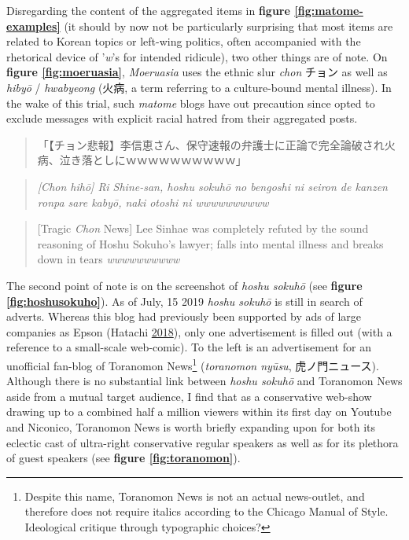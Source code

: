 \documentclass[10pt,british,A4paper,,openany]{memoir}
\begin{document}
Disregarding the content of the aggregated items in \textbf{figure
\ref{fig:matome-examples}} (it should by now not be particularly
surprising that most items are related to Korean topics or left-wing
politics, often accompanied with the rhetorical device of '\emph{w}'s
for intended ridicule), two other things are of note. On \textbf{figure
\ref{fig:moeruasia}}, \emph{Moeruasia} uses the ethnic slur \emph{chon}
チョン as well as \emph{hibyō} / \emph{hwabyeong} (火病, a term
referring to a culture-bound mental illness). In the wake of this trial,
such \emph{matome} blogs have out precaution since opted to exclude
messages with explicit racial hatred from their aggregated posts.

\begin{quote}
「【チョン悲報】李信恵さん、保守速報の弁護士に正論で完全論破され火病、泣き落としにｗｗｗｗｗｗｗｗｗｗ」
\end{quote}

\begin{quote}
\emph{{[}Chon hihō{]} Ri Shine-san, hoshu sokuhō no bengoshi ni seiron
de kanzen ronpa sare kabyō, naki otoshi ni wwwwwwwwww}
\end{quote}

\begin{quote}
{[}Tragic \emph{Chon} News{]} Lee Sinhae was completely refuted by the
sound reasoning of Hoshu Sokuho's lawyer; falls into mental illness and
breaks down in tears \emph{wwwwwwwwww}
\end{quote}

The second point of note is on the screenshot of \emph{hoshu sokuhō}
(see \textbf{figure \ref{fig:hoshusokuho}}). As of July, 15 2019
\emph{hoshu sokuhō} is still in search of adverts. Whereas this blog had
previously been supported by ads of large companies as Epson (Hatachi
\protect\hyperlink{ref-hatachi__2018}{2018}), only one advertisement is
filled out (with a reference to a small-scale web-comic). To the left is
an advertisement for an unofficial fan-blog of Toranomon News\footnote{Despite
  this name, Toranomon News is not an actual news-outlet, and therefore
  does not require italics according to the Chicago Manual of Style.
  Ideological critique through typographic choices?} (\emph{toranomon
nyūsu}, 虎ノ門ニュース). Although there is no substantial link between
\emph{hoshu sokuhō} and Toranomon News aside from a mutual target
audience, I find that as a conservative web-show drawing up to a
combined half a million viewers within its first day on Youtube and
Niconico, Toranomon News is worth briefly expanding upon for both its
eclectic cast of ultra-right conservative regular speakers as well as
for its plethora of guest speakers (see \textbf{figure
\ref{fig:toranomon}}).
\end{document}
